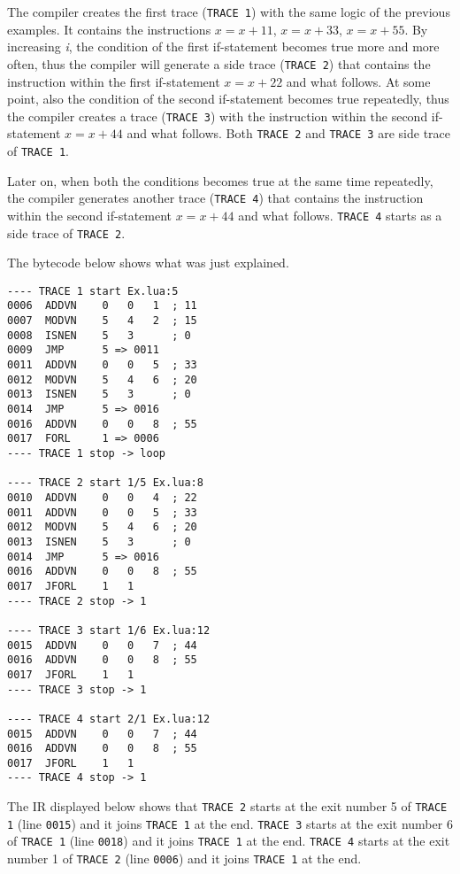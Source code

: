 \noindent
The compiler creates the first trace (\texttt{TRACE 1}) with the same logic of the previous examples. It contains the instructions $x=x+11$, $x=x+33$, $x=x+55$. By increasing \textit{i}, the condition of the first if-statement becomes true more and more often, thus the compiler will generate a side trace (\texttt{TRACE 2}) that contains the instruction within the first if-statement $x=x+22$ and what follows. At some point, also the condition of the second if-statement becomes true repeatedly, thus the compiler creates a trace (\texttt{TRACE 3}) with the instruction within the second if-statement $x=x+44$ and what follows. Both \texttt{TRACE 2} and \texttt{TRACE 3} are side trace of \texttt{TRACE 1}.
 
 Later on, when both the conditions becomes true at the same time repeatedly, the compiler generates another trace (\texttt{TRACE 4}) that contains the instruction within the second if-statement $x=x+44$ and what follows. \texttt{TRACE 4} starts as a side trace of \texttt{TRACE 2}.

The bytecode below shows what was just explained.

\begin{multicols}{2}
\begin{lstlisting}[style=DumpStyle]
---- TRACE 1 start Ex.lua:5
0006  ADDVN    0   0   1  ; 11
0007  MODVN    5   4   2  ; 15
0008  ISNEN    5   3      ; 0
0009  JMP      5 => 0011
0011  ADDVN    0   0   5  ; 33
0012  MODVN    5   4   6  ; 20
0013  ISNEN    5   3      ; 0
0014  JMP      5 => 0016
0016  ADDVN    0   0   8  ; 55
0017  FORL     1 => 0006
---- TRACE 1 stop -> loop

---- TRACE 2 start 1/5 Ex.lua:8
0010  ADDVN    0   0   4  ; 22
0011  ADDVN    0   0   5  ; 33
0012  MODVN    5   4   6  ; 20
0013  ISNEN    5   3      ; 0
0014  JMP      5 => 0016
0016  ADDVN    0   0   8  ; 55
0017  JFORL    1   1
---- TRACE 2 stop -> 1

---- TRACE 3 start 1/6 Ex.lua:12
0015  ADDVN    0   0   7  ; 44
0016  ADDVN    0   0   8  ; 55
0017  JFORL    1   1
---- TRACE 3 stop -> 1

---- TRACE 4 start 2/1 Ex.lua:12
0015  ADDVN    0   0   7  ; 44
0016  ADDVN    0   0   8  ; 55
0017  JFORL    1   1
---- TRACE 4 stop -> 1
\end{lstlisting}
\end{multicols}

\noindent
The IR displayed below shows that \texttt{TRACE 2} starts at the exit number 5 of \texttt{TRACE 1} (line \texttt{0015}) and it joins \texttt{TRACE 1} at the end. \texttt{TRACE 3} starts at the exit number 6 of \texttt{TRACE 1} (line \texttt{0018}) and it joins \texttt{TRACE 1} at the end. \texttt{TRACE 4} starts at the exit number 1 of \texttt{TRACE 2} (line \texttt{0006}) and it joins \texttt{TRACE 1} at the end. 


